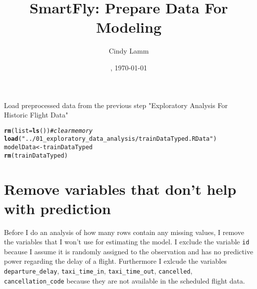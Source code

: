 \documentclass{article}\usepackage[]{graphicx}\usepackage[]{color}
\makeatletter
\newcommand{\hlstr}[1]{\textcolor[rgb]{0.192,0.494,0.8}{#1}}%
\newcommand{\hlcom}[1]{\textcolor[rgb]{0.678,0.584,0.686}{\textit{#1}}}%
\newcommand{\hlstd}[1]{\textcolor[rgb]{0.345,0.345,0.345}{#1}}%
\newcommand{\hlkwb}[1]{\textcolor[rgb]{0.69,0.353,0.396}{#1}}%
\newcommand{\hlkwc}[1]{\textcolor[rgb]{0.333,0.667,0.333}{#1}}%
\newcommand{\hlkwd}[1]{\textcolor[rgb]{0.737,0.353,0.396}{\textbf{#1}}}%
\newenvironment{kframe}{%
 \def\at@end@of@kframe{}%
 \ifinner\ifhmode%
  \def\at@end@of@kframe{\end{minipage}}%
  \begin{minipage}{\columnwidth}%
 \fi\fi%
 \def\FrameCommand##1{\hskip\@totalleftmargin \hskip-\fboxsep
 \colorbox{shadecolor}{##1}\hskip-\fboxsep
     \hskip-\linewidth \hskip-\@totalleftmargin \hskip\columnwidth}%
 \MakeFramed {\advance\hsize-\width
   \@totalleftmargin\z@ \linewidth\hsize
   \@setminipage}}%
 {\par\unskip\endMakeFramed%
 \at@end@of@kframe}
\newenvironment{knitrout}{}{} %
\makeatother
\begin{document}
\date{\currenttime, \today}
\title{SmartFly: Prepare Data For Modeling}
\author{Cindy Lamm}

\maketitle

Load preprocessed data from the previous step "Exploratory Analysis For Historic Flight Data"
\begin{knitrout}
\color{fgcolor}\begin{kframe}
\begin{alltt}
\hlkwd{rm}\hlstd{(}\hlkwc{list}\hlstd{=}\hlkwd{ls}\hlstd{())}   \hlcom{#clear memory}
\hlkwd{load}\hlstd{(}\hlstr{"../01_exploratory_data_analysis/trainDataTyped.RData"}\hlstd{)}
\hlstd{modelData} \hlkwb{<-} \hlstd{trainDataTyped}
\hlkwd{rm}\hlstd{(trainDataTyped)}
\end{alltt}
\end{kframe}
\end{knitrout}

\section{Remove variables that don't help with prediction}

Before I do an analysis of how many rows contain any missing values, I remove the variables that I won't use for estimating the model. I exclude the variable \verb+id+ because I assume it is randomly assigned to the observation and has no predictive power regarding the delay of a flight.
Furthermore I exlcude the variables \verb+departure_delay+, \verb+taxi_time_in+, \verb+taxi_time_out+, \verb+cancelled+, \verb+cancellation_code+ because they are not available in the scheduled flight data.
\end{document}
